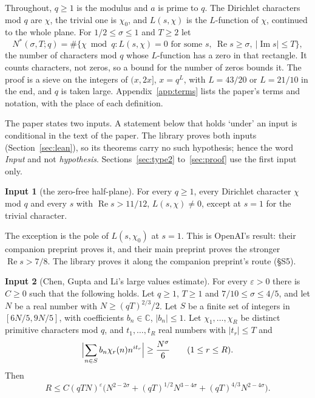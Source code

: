 \documentclass[11pt]{article}
\theoremstyle{definition}
\newtheorem{inputthm}{Input}
\begin{document}
Throughout, $q \ge 1$ is the modulus and $a$ is prime to $q$. The Dirichlet characters mod $q$ are $\chi$, the trivial
one is $\chi_0$, and $L(s, \chi)$ is the $L$-function of $\chi$, continued to the whole plane. For
$1/2 \le \sigma \le 1$ and $T \ge 2$ let
\[
  N^*(\sigma, T; q) = \#\{\chi \bmod q : L(s, \chi) = 0 \text{ for some } s,\
  \operatorname{Re} s \ge \sigma,\ |\operatorname{Im} s| \le T\},
\]
the number of characters mod $q$ whose $L$-function has a zero in that rectangle. It counts characters, not zeros, so
a bound
for the number of zeros bounds it. The proof is a sieve on the integers of $(x, 2x]$, $x = q^L$, with $L = 43/20$ or
$L = 21/10$ in the end, and $q$ is taken large. Appendix~\ref{app:terms} lists the paper's terms and notation, with
the place of each definition.

The paper states two inputs. A statement below that holds `under' an input is conditional in the text of the paper.
The library proves both inputs (Section~\ref{sec:lean}), so its theorems carry no such hypothesis; hence the word
\emph{Input} and not \emph{hypothesis}.
Sections~\ref{sec:type2} to~\ref{sec:proof} use the first input only.

\begin{inputthm}[the zero-free half-plane]\label{inp:half-plane}
For every $q \ge 1$, every Dirichlet character $\chi$ mod $q$ and every $s$ with $\operatorname{Re} s > 11/12$,
$L(s, \chi) \ne 0$, except at $s = 1$ for the trivial character.
\end{inputthm}

The exception is the pole of $L(s, \chi_0)$ at $s = 1$. This is OpenAI's result: their companion preprint
\cite{openai-companion} proves it, and their main preprint \cite{openai-main} proves the stronger
$\operatorname{Re} s > 7/8$. The library proves it along the companion preprint's route (\S S5).

\begin{inputthm}[Chen, Gupta and Li's large values estimate]\label{inp:cgl}
For every $\varepsilon > 0$ there is $C \ge 0$ such that the following holds. Let $q \ge 1$, $T \ge 1$ and
$7/10 \le \sigma \le 4/5$, and let $N$ be a real number with $N \ge (qT)^{2/3}/2$. Let $S$ be a finite set of integers
in $[6N/5, 9N/5]$, with coefficients $b_n \in \mathbb C$, $|b_n| \le 1$. Let $\chi_1, \dots, \chi_R$ be distinct
primitive characters mod $q$, and $t_1, \dots, t_R$ real numbers with $|t_r| \le T$ and
\[
  \Bigl| \sum_{n \in S} b_n \chi_r(n) n^{it_r} \Bigr| \ge \frac{N^\sigma}{6} \qquad (1 \le r \le R).
\]
Then
\[
  R \le C (qTN)^{\varepsilon} \bigl( N^{2 - 2\sigma} + (qT)^{1/2} N^{3 - 4\sigma} + (qT)^{4/3} N^{2 - 4\sigma} \bigr).
\]
\end{inputthm}
\end{document}
